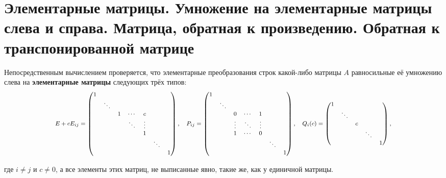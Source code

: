 \section{Элементарные матрицы. Умножение на элементарные матрицы слева и справа. Матрица, обратная к произведению. Обратная к транспонированной матрице}

\begin{definition}
    Непосредственным вычислением проверяется, что элементарные преобразования строк какой-либо матрицы $A$ равносильные её умножению слева на \textbf{элементарные матрицы} следующих трёх типов:
    $$\footnotesize
    \begin{array}{c}
    E + cE_{ij} = 
    \begin{pmatrix}
        1 & {} & {} & {} & {} & {} & {}\\
        {} & \ddots & {} & {} & {} & {} & {}\\
        {} & {} & 1 & \cdots & c & {} & {}\\
        {} & {} & {} & \ddots & \vdots & {} & {}\\
        {} & {} & {} & {} & 1 & {} & {}\\
        {} & {} & {} & {} & {} & \ddots & {}\\
        {} & {} & {} & {} & {} & {} & 1
    \end{pmatrix},\quad
    P_{ij} = 
    \begin{pmatrix}
        1 & {} & {} & {} & {} & {} & {}\\
        {} & \ddots & {} & {} & {} & {} & {}\\
        {} & {} & 0 & \cdots & 1 & {} & {}\\
        {} & {} & \vdots & \ddots & \vdots & {} & {}\\
        {} & {} & 1 & \cdots & 0 & {} & {}\\
        {} & {} & {} & {} & {} & \ddots & {}\\
        {} & {} & {} & {} & {} & {} & 1
    \end{pmatrix},\quad
    Q_i(c) = 
    \begin{pmatrix}
        1 & {} & {} & {} & {}\\ 
        {} & \ddots & {} & {} & {}\\
        {} & {} & c & {} & {}\\ 
        {} & {} & {} & \ddots & {}\\
        {} & {} & {} & {} & 1
    \end{pmatrix},
    \end{array}
    $$

    где $i \ne j$ и $c \ne 0$, а все элементы этих матриц, не выписанные явно, такие же, как у единичной матрицы.
\end{definition}

